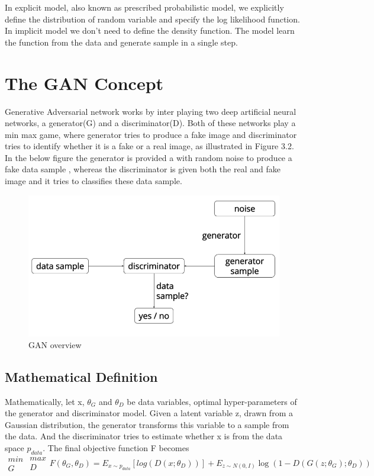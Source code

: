 In explicit model, also known as prescribed probabilistic model, we explicitly define the distribution of random variable and specify the log likelihood function.
In implicit model we don't need to define the density function\cite{1}. The model learn the function from the data and generate sample in a single step.

\section{The GAN  Concept}
Generative Adversarial network works by inter playing two deep artificial neural networks, a generator(G) and a discriminator(D). Both of these networks play a min max game, where generator tries to produce a fake image and discriminator tries to identify whether it is a fake or a real image, as illustrated in Figure 3.2. In the below figure the generator is provided a with random noise to produce a fake data sample , whereas the discriminator is given both the real and fake image and it tries to classifies these data sample.
\begin{figure}[t]

  \centering
    \includegraphics[scale=.4, angle=0]{Files/gan-overview.png}
    \caption[GAN overview]{ GAN overview\cite{Gan-overview}}
    \label{fig: GAN-Overview}
\end{figure}
\newpage
\subsection{Mathematical Definition}
Mathematically, let x,  $\theta_{G}$  and $\theta_{D}$ be data variables, optimal hyper-parameters of the generator and discriminator model.
Given a latent variable z, drawn from a Gaussian distribution, the generator transforms this variable to a sample from the data. And the discriminator tries to estimate whether x is from the data space $p_{data}$. The final objective function F becomes
$$ \substack{min\\ G} \substack{max\\ D} F (\theta_{G}, \theta_{D}) = E_{x\sim p_{data}} [log (D (x; \theta_{D}))] + E_{z\sim N(0,I)}\log (1- D(G (z; \theta_{G}) ; \theta_{D}))$$
